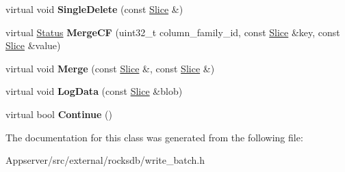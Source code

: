 \begin{DoxyCompactItemize}
\item 
virtual void {\bfseries Single\+Delete} (const \hyperlink{classrocksdb_1_1Slice}{Slice} \&)\hypertarget{classrocksdb_1_1WriteBatch_1_1Handler_a1d3d553cacbc2f1fa34790d8670c8ac6}{}\label{classrocksdb_1_1WriteBatch_1_1Handler_a1d3d553cacbc2f1fa34790d8670c8ac6}

\item 
virtual \hyperlink{classrocksdb_1_1Status}{Status} {\bfseries Merge\+CF} (uint32\+\_\+t column\+\_\+family\+\_\+id, const \hyperlink{classrocksdb_1_1Slice}{Slice} \&key, const \hyperlink{classrocksdb_1_1Slice}{Slice} \&value)\hypertarget{classrocksdb_1_1WriteBatch_1_1Handler_ad388aaf5b4570a2c20c3095c56b8b34f}{}\label{classrocksdb_1_1WriteBatch_1_1Handler_ad388aaf5b4570a2c20c3095c56b8b34f}

\item 
virtual void {\bfseries Merge} (const \hyperlink{classrocksdb_1_1Slice}{Slice} \&, const \hyperlink{classrocksdb_1_1Slice}{Slice} \&)\hypertarget{classrocksdb_1_1WriteBatch_1_1Handler_a1ff8fc8861c143729bcba6733ae04567}{}\label{classrocksdb_1_1WriteBatch_1_1Handler_a1ff8fc8861c143729bcba6733ae04567}

\item 
virtual void {\bfseries Log\+Data} (const \hyperlink{classrocksdb_1_1Slice}{Slice} \&blob)\hypertarget{classrocksdb_1_1WriteBatch_1_1Handler_ac3e39bf94f61573a522a7f0825bc5332}{}\label{classrocksdb_1_1WriteBatch_1_1Handler_ac3e39bf94f61573a522a7f0825bc5332}

\item 
virtual bool {\bfseries Continue} ()\hypertarget{classrocksdb_1_1WriteBatch_1_1Handler_a8f3ffb10b28171ac4f9cdd379815abf1}{}\label{classrocksdb_1_1WriteBatch_1_1Handler_a8f3ffb10b28171ac4f9cdd379815abf1}

\end{DoxyCompactItemize}


The documentation for this class was generated from the following file\+:\begin{DoxyCompactItemize}
\item 
Appserver/src/external/rocksdb/write\+\_\+batch.\+h\end{DoxyCompactItemize}
